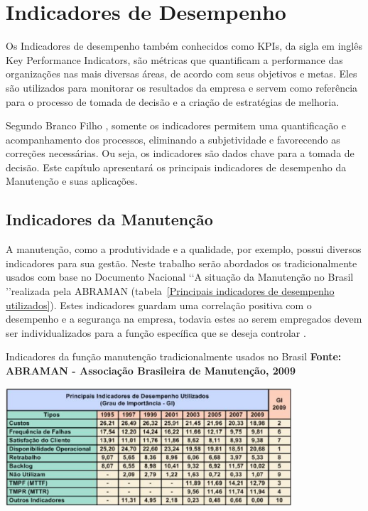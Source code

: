 \chapter{Indicadores de Desempenho}
\label{indicadores}

Os Indicadores de desempenho também conhecidos como KPIs, da sigla em inglês Key Performance Indicators, são métricas que quantificam a performance das organizações nas mais diversas áreas, de acordo com seus objetivos e metas. Eles são utilizados para monitorar os resultados da empresa e servem como referência para o processo de tomada de decisão e a criação de estratégias de melhoria. 

Segundo Branco Filho \cite{branco2006indicadores}, somente os indicadores permitem uma quantificação e acompanhamento dos processos, eliminando a subjetividade e favorecendo as correções necessárias. Ou seja, os indicadores são dados chave para a tomada de decisão. Este capítulo apresentará os principais indicadores de desempenho da Manutenção e suas aplicações.

\section{Indicadores da Manutenção}
\label{SIM}

A manutenção, como a produtividade e a qualidade, por exemplo, possui diversos indicadores para sua gestão. Neste trabalho serão abordados os tradicionalmente usados com base no Documento Nacional \lq\lq A situação da Manutenção no Brasil \rq\rq realizada pela ABRAMAN (tabela~\ref{Principais indicadores de desempenho utilizados}). Estes indicadores guardam uma correlação positiva com o desempenho e a segurança na empresa, todavia estes ao serem empregados devem ser individualizados para a função específica que se deseja controlar \cite{martorell1999}.

\graphicspath{{figuras/}}	
\begin{table}[H]
\centering
\caption{Indicadores da função manutenção tradicionalmente usados no Brasil \textbf{Fonte: ABRAMAN - Associação Brasileira de Manutenção, 2009}}
\includegraphics[width=0.8\textwidth]{PrincipaisIndicadores.eps}
\label{Principais indicadores de desempenho utilizados}
\end{table}

